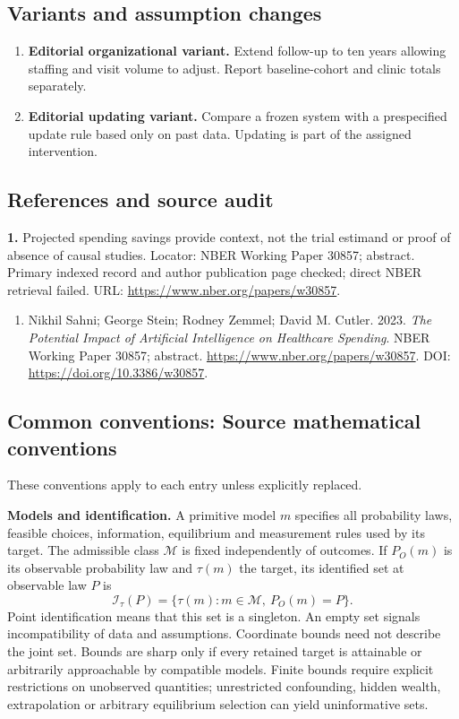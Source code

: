 \documentclass[11pt,a4paper]{article}
\begin{document}
\subsection*{Variants and assumption changes}
\begin{enumerate}
\item \textbf{Editorial organizational variant.} Extend follow-up to ten years allowing staffing and visit volume to adjust. Report baseline-cohort and clinic totals separately.
\item \textbf{Editorial updating variant.} Compare a frozen system with a prespecified update rule based only on past data. Updating is part of the assigned intervention.
\end{enumerate}
\subsection*{References and source audit}
\textbf{1.} Projected spending savings provide context, not the trial estimand or proof of absence of causal studies. Locator: NBER Working Paper 30857; abstract. Primary indexed record and author publication page checked; direct NBER retrieval failed. URL: \url{https://www.nber.org/papers/w30857}.
\begin{enumerate}\raggedright
\item\hypertarget{definitions:source:30007729:1}{} Nikhil Sahni; George Stein; Rodney Zemmel; David M. Cutler. 2023. \emph{The Potential Impact of Artificial Intelligence on Healthcare Spending}. NBER Working Paper 30857; abstract.
\url{https://www.nber.org/papers/w30857}.
DOI: \url{https://doi.org/10.3386/w30857}.
\end{enumerate}

\subsection*{Common conventions: Source mathematical conventions}

These conventions apply to each entry unless explicitly replaced.

\textbf{Models and identification.} A primitive model \(m\) specifies all probability laws, feasible choices, information, equilibrium and measurement rules used by its target. The admissible class \(\mathcal M\) is fixed independently of outcomes. If \(P_O(m)\) is its observable probability law and \(\tau(m)\) the target, its identified set at observable law \(P\) is
\[
 \mathcal I_\tau(P)=\{\tau(m):m\in\mathcal M,\ P_O(m)=P\}.
\]
Point identification means that this set is a singleton. An empty set signals incompatibility of data and assumptions. Coordinate bounds need not describe the joint set. Bounds are sharp only if every retained target is attainable or arbitrarily approachable by compatible models. Finite bounds require explicit restrictions on unobserved quantities; unrestricted confounding, hidden wealth, extrapolation or arbitrary equilibrium selection can yield uninformative sets.
\end{document}
